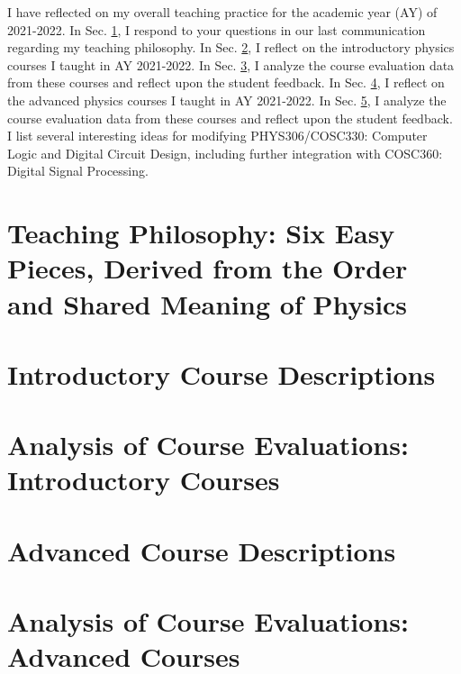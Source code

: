 \documentclass[../../main.tex]{subfiles}
\begin{document}
\label{sec:teaching}

I have reflected on my overall teaching practice for the academic year (AY) of 2021-2022.  In Sec. \ref{sec:teaching_philosophy}, I respond to your questions in our last communication regarding my teaching philosophy.  In Sec. \ref{sec:intro}, I reflect on the introductory physics courses I taught in AY 2021-2022.  In Sec. \ref{sec:intro_eval}, I analyze the course evaluation data from these courses and reflect upon the student feedback.  In Sec. \ref{sec:adv}, I reflect on the advanced physics courses I taught in AY 2021-2022.  In Sec. \ref{sec:adv_eval}, I analyze the course evaluation data from these courses and reflect upon the student feedback.  I list several interesting ideas for modifying PHYS306/COSC330: Computer Logic and Digital Circuit Design, including further integration with COSC360: Digital Signal Processing.

\section{Teaching Philosophy: Six Easy Pieces, Derived from the Order and Shared Meaning of Physics}
\label{sec:teaching_philosophy}

\begin{flushleft}

\end{flushleft}

\section{Introductory Course Descriptions}
\label{sec:intro}

\begin{flushleft}

\end{flushleft}

\section{Analysis of Course Evaluations: Introductory Courses}
\label{sec:intro_eval}

\begin{flushleft}

\end{flushleft}

\section{Advanced Course Descriptions}
\label{sec:adv}

\begin{flushleft}

\end{flushleft}

\section{Analysis of Course Evaluations: Advanced Courses}
\label{sec:adv_eval}

\begin{flushleft}

\end{flushleft}
\end{document}

